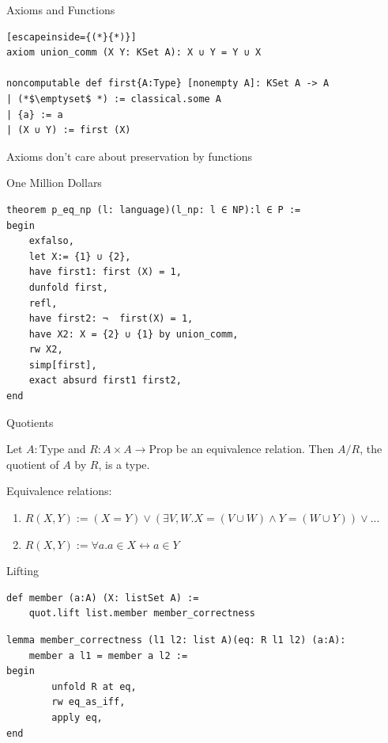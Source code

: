\documentclass[aspectratio=169]{beamer}
\begin{document}
    
    \begin{frame}[fragile]{Axioms and Functions}
        \begin{lstlisting}[escapeinside={(*}{*)}]
axiom union_comm (X Y: KSet A): X ∪ Y = Y ∪ X

noncomputable def first{A:Type} [nonempty A]: KSet A -> A
| (*$\emptyset$ *) := classical.some A
| {a} := a
| (X ∪ Y) := first (X)
    \end{lstlisting}
        \begin{block}{}
            Axioms don't care about preservation by functions
        \end{block}
    \end{frame}
    \begin{frame}[fragile]{One Million Dollars}
        \begin{lstlisting}
theorem p_eq_np (l: language)(l_np: l ∈ NP):l ∈ P :=
begin
    exfalso,
    let X:= {1} ∪ {2},
    have first1: first (X) = 1,
    dunfold first,
    refl,
    have first2: ¬  first(X) = 1,
    have X2: X = {2} ∪ {1} by union_comm,
    rw X2,
    simp[first],
    exact absurd first1 first2,
end
            \end{lstlisting}
    \end{frame}
    \begin{frame}{Quotients}
        \begin{definition}
            Let $A: \text{{Type}}$ and $R: A \times A \to \text{{Prop}}$ be an equivalence relation.
            Then $A/R$, the quotient of $A$ by $R$, is a type.
        \end{definition}
    \pause
    Equivalence relations:
    \begin{enumerate}[<+->]
        \item $R(X,Y) := (X = Y) \lor (\exists V, W. X= (V \cup W) \land Y = (W \cup Y)) \lor ...$
        \item $R(X,Y) := \forall a. a \in X \leftrightarrow a \in Y$
    \end{enumerate}

    \end{frame}
    \begin{frame}[fragile]{Lifting}
    \begin{lstlisting}
def member (a:A) (X: listSet A) := 
    quot.lift list.member member_correctness
    \end{lstlisting}

    \begin{lstlisting}
lemma member_correctness (l1 l2: list A)(eq: R l1 l2) (a:A): 
    member a l1 = member a l2 :=
begin
        unfold R at eq,
        rw eq_as_iff,
        apply eq,
end
    \end{lstlisting}
    \end{frame}
\end{document}
